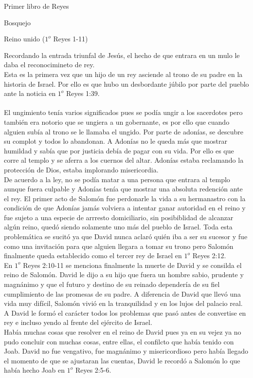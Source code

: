 \begin{section}{Primer libro de Reyes}
\begin{subsection}{Bosquejo}
\begin{subsubsection}{Reino unido ($1^{o}$ Reyes 1-11)}
\begin{enumerate}
					Recordando la entrada triunfal de Jesús, el hecho de que entrara en un mulo le daba el reconocimineto de rey.\\
					Esta es la primera vez que un hijo de un rey asciende al trono de su padre en la historia de Israel. Por ello es que hubo un desbordante júbilo por parte del pueblo ante la noticia en $1^{o}$ Reyes 1:39.\\ \\
					El ungimiento tenía varios significados pues se podía ungir a los sacerdotes pero también era notorio que se ungiera a un gobernante, es por ello que cuando alguien subía al trono se le llamaba el ungido. Por parte de adonías, se descubre su complot y todos lo abandonan. A Adonías no le queda más que mostrar humildad y sabía que por justicia debía de pagar con su vida. Por ello es que corre al templo y se aferra a los cuernos del altar. Adonías estaba reclamando la protección de Dios, estaba implorando misericordia.\\
					De acuerdo a la ley, no se podía matar a una persona que entrara al templo aunque fuera culpable y Adonías tenía que mostrar una absoluta redención ante el rey. El primer acto de Salomón fue perdonarle la vida a su hermanastro con la condición de que Adonías jamás volviera a intentar ganar autoridad en el reino y fue sujeto a una especie de arrresto domiciliario, sin posibiblidad de alcanzar algún reino, quedó siendo solamente uno más del pueblo de Israel. 
					\newpage 
					Toda esta problemática se sucitó ya que David nunca aclaró quién iba a ser su sucesor y fue como una invitación para que alguien llegara a tomar su trono pero Salomón finalmente queda establecido como el tercer rey de Israel en $1^{o}$ Reyes 2:12.\\
					En $1^{o}$ Reyes 2:10-11 se menciona finalmente la muerte de David y se consilda el reino de Salomón. David le dijo a su hijo que fuera un hombre sabio, prudente y magnánimo y que el futuro y destino de su reinado dependería de su fiel cumplimiento de las promesas de su padre. A diferencia de David que llevó una vida muy difícil, Salomón vivió en la tranquilidad y en los lujos del palacio real. A David le formó el carácter todos los problemas que pasó antes de convertise en rey e incluso yendo al frente del ejército de Israel.\\
					Había muchas cosas que resolver en el reino de David pues ya en su vejez ya no pudo concluir con muchas cosas, entre ellas, el confilcto que había tenido con Joab. David no fue vengativo, fue magnánimo y misericordioso pero había llegado el momento de que se ajustaran las cuentas, David le recordó a Salomón lo que había hecho Joab en $1^{o}$ Reyes 2:5-6.\\ \\

\end{enumerate}
\end{subsubsection}
\end{subsection}
\end{section}
